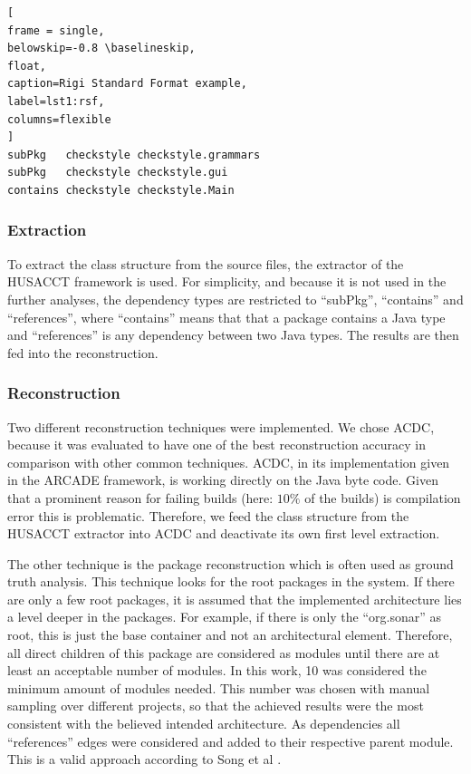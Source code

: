 \documentclass[sigplan, anonymous, review]{acmart}
\begin{document}
\begin{lstlisting}[
frame = single, 
belowskip=-0.8 \baselineskip,
float,
caption=Rigi Standard Format example,
label=lst1:rsf,
columns=flexible
]
subPkg   checkstyle checkstyle.grammars
subPkg   checkstyle checkstyle.gui
contains checkstyle checkstyle.Main
\end{lstlisting}



\subsubsection{Extraction}

To extract the class structure from the source files, the extractor of the HUSACCT framework is used. For simplicity, and because it is not used in the further analyses, the dependency types are restricted to ``subPkg'', ``contains'' and ``references'', where ``contains'' means that that a package contains a Java type and ``references'' is any dependency between two Java types. The results are then fed into the reconstruction.

\subsubsection{Reconstruction}

Two different reconstruction techniques were implemented. We chose ACDC, because it was evaluated to have one of the best reconstruction accuracy \cite{arcRec-comparison} in comparison with other common techniques. ACDC, in its implementation given in the ARCADE framework, is working directly on the Java byte code. Given that a prominent reason for failing builds (here: $10\%$ of the builds) is compilation error this is problematic. Therefore, we feed the class structure from the HUSACCT extractor into ACDC and deactivate its own first level extraction.

The other technique is the package reconstruction which is often used as ground truth analysis.
This technique looks for the root packages in the system. If there are only a few root packages, it is assumed that the implemented architecture lies a level deeper in the packages. For example, if there is only the ``org.sonar'' as root, this is just the base container and not an architectural element. Therefore, all direct children of this package are considered as modules until there are at least an acceptable number of modules. In this work, 10 was considered the minimum amount of modules needed. This number was chosen with manual sampling over different projects, so that the achieved results were the most consistent with the believed intended architecture. As dependencies all ``references'' edges were considered and added to their respective parent module. This is a valid approach according to Song et al \cite{ArcAsGraph}. 
\end{document}
